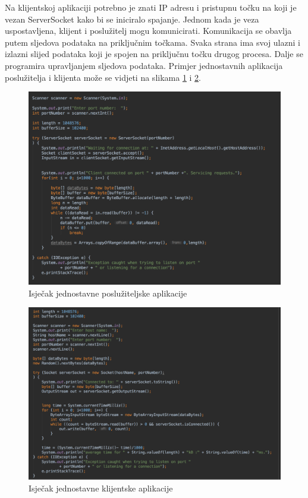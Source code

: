 \documentclass[times, utf8, zavrsni, square]{fer}
\begin{document}
Na klijentskoj aplikaciji potrebno je znati IP adresu i pristupnu točku na koji je vezan ServerSocket kako bi se iniciralo spajanje.
Jednom kada je veza uspostavljena, klijent i poslužitelj mogu komunicirati.
Komunikacija se obavlja putem sljedova podataka na priključnim točkama.
Svaka strana ima svoj ulazni i izlazni slijed podataka koji je spojen na priključnu točku drugog procesa.
Dalje se programira upravljanjem sljedova podataka.
Primjer jednostavnih aplikacija poslužitelja i klijenta može se vidjeti na slikama \ref{fig:server_example} i \ref{fig:client_example}.


\begin{figure}[h!]
    \centering
    \includegraphics[width=1\textwidth]{server_example}
    \caption{Isječak jednostavne poslužiteljske aplikacije}
    \label{fig:server_example}
\end{figure} 
\begin{figure}[h!]
    \centering
    \includegraphics[width=1\textwidth]{client_example}
    \caption{Isječak jednostavne klijentske aplikacije}
    \label{fig:client_example}
\end{figure} 
\FloatBarrier
\end{document}
